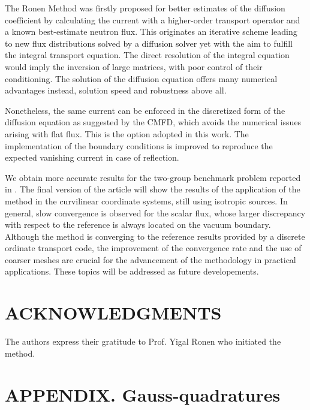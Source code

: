 \documentclass{ictt26}
\begin{document}
The Ronen Method was firstly proposed for better estimates of the diffusion coefficient by calculating the current with a higher-order transport operator and a known best-estimate neutron flux. This originates an iterative scheme leading to new flux distributions solved by a diffusion solver yet with the aim to fulfill the integral transport equation. The direct resolution of the integral equation would imply the inversion of large matrices, with poor control of their conditioning. The solution of the diffusion equation offers many numerical advantages instead, solution speed and robustness above all.

Nonetheless, the same current can be enforced in the discretized form of the diffusion equation as suggested by the CMFD, which avoids the numerical issues arising with flat flux. This is the option adopted in this work. The implementation of the boundary conditions is improved to reproduce the expected vanishing current in case of reflection.

We obtain more accurate results for the two-group benchmark problem reported in \cite{tomatis2011application}. The final version of the article will show the results of the application of the method in the curvilinear coordinate systems, still using isotropic sources. In general, slow convergence is observed for the scalar flux, whose larger discrepancy with respect to the reference is always located on the vacuum boundary. Although the method is converging to the reference results provided by a discrete ordinate transport code, the improvement of the convergence rate and the use of coarser meshes are crucial for the advancement of the methodology in practical applications. These topics will be addressed as future developements.


\section*{ACKNOWLEDGMENTS}

The authors express their gratitude to Prof. Yigal Ronen who initiated the method.

\appendix
\section{APPENDIX. Gauss-quadratures}
\label{sec:apx_Flurig}
\end{document}
